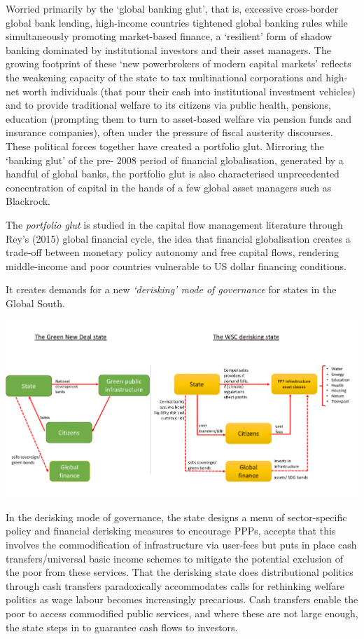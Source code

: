 \documentclass[
]{book}
\begin{document}
Worried primarily
by the `global banking glut', that is, excessive cross-border global bank
lending, high-income countries tightened global banking rules while simultaneously
promoting market-based finance, a `resilient' form of shadow banking dominated by
institutional investors and their asset managers. The growing footprint of these `new
powerbrokers of modern capital markets'
reflects the weakening capacity of the state to tax multinational corporations and high-
net worth individuals (that pour their cash into institutional investment vehicles) and to
provide traditional welfare to its citizens via public health, pensions, education
(prompting them to turn to asset-based welfare via pension funds and insurance
companies), often under the pressure of fiscal austerity discourses. These political
forces together have created a portfolio glut. Mirroring the `banking glut' of the pre-
2008 period of financial globalisation, generated by a handful of global banks, the
portfolio glut is also characterised unprecedented concentration of capital in the hands
of a few global asset managers such as Blackrock.

The \emph{portfolio glut} is studied in the capital flow management literature
through Rey's (2015) global financial cycle, the idea that
financial globalisation creates a trade-off between monetary policy autonomy and free
capital flows, rendering middle-income and poor countries vulnerable to US dollar
financing conditions.

It creates demands for a new \emph{`derisking' mode of governance} for states in the Global South.

\includegraphics{fig/WSC_State.png}

In the derisking mode of governance, the state designs a menu of sector-specific policy
and financial derisking measures to encourage PPPs, accepts that this involves the
commodification of infrastructure via user-fees but puts in place cash
transfers/universal basic income schemes to mitigate the potential exclusion of the poor
from these services. That the derisking state does distributional politics through cash
transfers paradoxically accommodates calls for rethinking welfare politics as wage
labour becomes increasingly precarious.
Cash transfers enable the poor to access commodified public services,
and where these are not large enough, the state steps in to guarantee cash flows to investors.
\end{document}
